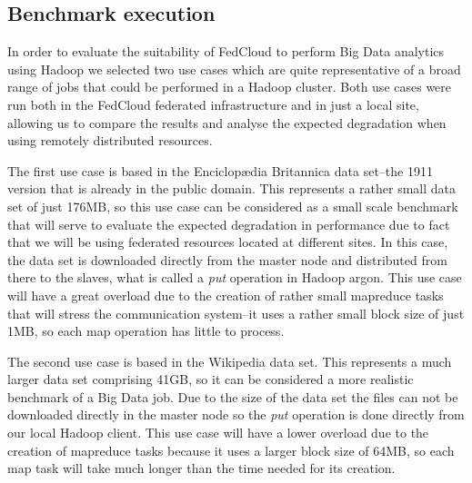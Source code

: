 \documentclass[oribibl]{llncs_Ibergrid2013}
\begin{document}


\subsection{Benchmark execution}
\label{ssect-execution}

In order to evaluate the suitability of FedCloud to perform Big Data analytics using Hadoop we selected two use cases which are quite representative of a broad range of jobs that could be performed in a Hadoop cluster. Both use cases were run both in the FedCloud federated infrastructure and in just a local site, allowing us to compare the results and analyse the expected degradation when using remotely distributed resources.




The first use case is based in the Enciclop{\ae}dia Britannica\cite{britannica} data set--the 1911 version that is already in the public domain. This represents a rather small data set of just 176MB, so this use case can be considered as a small scale benchmark that will serve to evaluate the expected degradation in performance due to fact that we will be using federated resources located at different sites. In this case, the data set is downloaded directly from the master node and distributed from there to the slaves, what is called a \emph{put} operation in Hadoop argon. This use case will have a great overload due to the creation of rather small mapreduce tasks that will stress the communication system--it uses a rather small block size of just 1MB, so each map operation has little to process.

The second use case is based in the Wikipedia\cite{wikipedia} data set. This represents a much larger data set comprising 41GB, so it can be considered a more realistic benchmark of a Big Data job. Due to the size of the data set the files can not be downloaded directly in the master node so the \emph{put} operation is done directly from our local Hadoop client. This use case will have a lower overload due to the creation of mapreduce tasks because it uses a larger block size of 64MB, so each map task will take much longer than the time needed for its creation.
\end{document}
